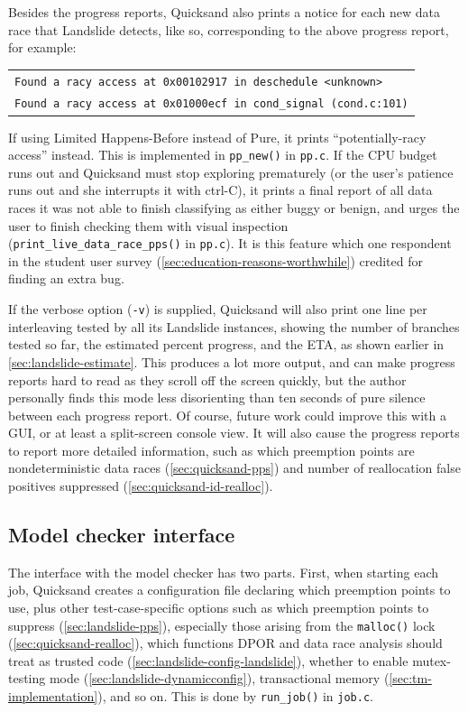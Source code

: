 Besides the progress reports, Quicksand also prints a notice for each new data race that Landslide detects,
like so, corresponding to the above progress report, for example:
\begin{center}
	\begin{tabular}{l}
	{\tt Found a racy access at 0x00102917 in deschedule <unknown>} \\
	{\tt Found a racy access at 0x01000ecf in cond\_signal (cond.c:101)}
	\end{tabular}
\end{center}
If using Limited Happens-Before instead of Pure,
it prints ``potentially-racy access'' instead.
This is implemented in {\tt pp\_new()} in {\tt pp.c}.
If the CPU budget runs out and Quicksand must stop exploring prematurely
(or the user's patience runs out and she interrupts it with ctrl-C),
it prints a final report of all data races it was not able to finish classifying as either buggy or benign,
and urges the user to finish checking them with visual inspection
({\tt print\_live\_data\_race\_pps()} in {\tt pp.c}).
It is this feature which one respondent in the student user survey (\cref{sec:education-reasons-worthwhile})
credited for finding an extra bug.

If the verbose option ({\tt -v}) is supplied,
Quicksand will also print one line per interleaving tested by all its Landslide instances,
showing the number of branches tested so far, the estimated percent progress, and the ETA,
as shown earlier in \cref{sec:landslide-estimate}.
This produces a lot more output, and can make progress reports hard to read as they scroll off the screen quickly,
but the author personally finds this mode less disorienting than ten seconds of pure silence between each progress report.
Of course, future work could improve this with a GUI, or at least a split-screen console view.
It will also cause the progress reports to report more detailed information,
such as which preemption points are nondeterministic data races (\cref{sec:quicksand-pps})
and number of reallocation false positives suppressed (\cref{sec:quicksand-id-realloc}).

\subsection{Model checker interface}
\label{sec:quicksand-impl-mc}

The interface with the model checker has two parts.
First, when starting each job, Quicksand creates a configuration file declaring which preemption points to use,
plus other test-case-specific options such as
which preemption points to suppress (\cref{sec:landslide-pps}),
especially those arising from the {\tt malloc()} lock (\cref{sec:quicksand-realloc}),
which functions DPOR and data race analysis should treat as trusted code (\cref{sec:landslide-config-landslide}),
whether to enable mutex-testing mode (\cref{sec:landslide-dynamicconfig}),
transactional memory (\cref{sec:tm-implementation}),
and so on.
This is done by {\tt run\_job()} in {\tt job.c}.

